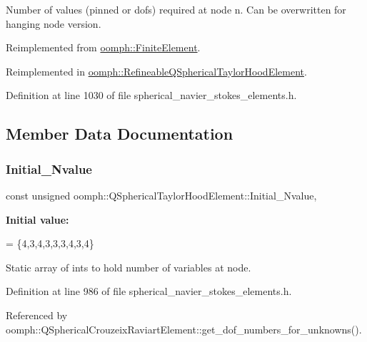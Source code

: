 Number of values (pinned or dofs) required at node n. Can be overwritten for hanging node version. 



Reimplemented from \hyperlink{classoomph_1_1FiniteElement_a56610c60d5bc2d7c27407a1455471b1a}{oomph\+::\+Finite\+Element}.



Reimplemented in \hyperlink{classoomph_1_1RefineableQSphericalTaylorHoodElement_af98a332a45e09b9746cd371c5f9cc109}{oomph\+::\+Refineable\+Q\+Spherical\+Taylor\+Hood\+Element}.



Definition at line 1030 of file spherical\+\_\+navier\+\_\+stokes\+\_\+elements.\+h.



\subsection{Member Data Documentation}
\mbox{\label{classoomph_1_1QSphericalTaylorHoodElement_abdb8b06dabe4d4982ba86b83fc8cd4db}} 
\subsubsection{\texorpdfstring{Initial\+\_\+\+Nvalue}{Initial\_Nvalue}}
{\footnotesize\ttfamily const unsigned oomph\+::\+Q\+Spherical\+Taylor\+Hood\+Element\+::\+Initial\+\_\+\+Nvalue\hspace{0.3cm}{\ttfamily [static]}, {\ttfamily [private]}}

{\bfseries Initial value\+:}
\begin{DoxyCode}
=
\{4,3,4,3,3,3,4,3,4\}
\end{DoxyCode}


Static array of ints to hold number of variables at node. 



Definition at line 986 of file spherical\+\_\+navier\+\_\+stokes\+\_\+elements.\+h.



Referenced by oomph\+::\+Q\+Spherical\+Crouzeix\+Raviart\+Element\+::get\+\_\+dof\+\_\+numbers\+\_\+for\+\_\+unknowns().

